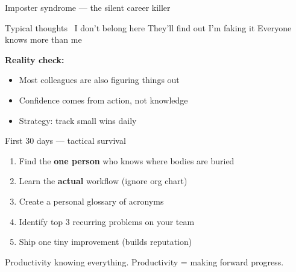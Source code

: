 \documentclass[aspectratio=169, 11pt]{beamer}
\begin{document}
	\begin{frame}{Imposter syndrome — the silent career killer}
		\begin{block}{Typical thoughts}
			\ I don't belong here   They'll find out I'm faking it  Everyone knows more than me  
		\end{block}
		\vspace{0.2cm}
		\textbf{Reality check:}
		\begin{itemize}
			\item Most colleagues are also figuring things out
			\item Confidence comes from action, not knowledge
			\item Strategy: track small wins daily
		\end{itemize}
	\end{frame}
	
	\begin{frame}{First 30 days — tactical survival}
		\begin{enumerate}
			\item Find the \textbf{one person} who knows where bodies are buried
			\item Learn the \textbf{actual} workflow (ignore org chart)
			\item Create a personal glossary of acronyms
			\item Identify top 3 recurring problems on your team
			\item Ship one tiny improvement (builds reputation)
		\end{enumerate}
		\alert{Productivity   knowing everything. Productivity = making forward progress.}
	\end{frame}
	
\end{document}
